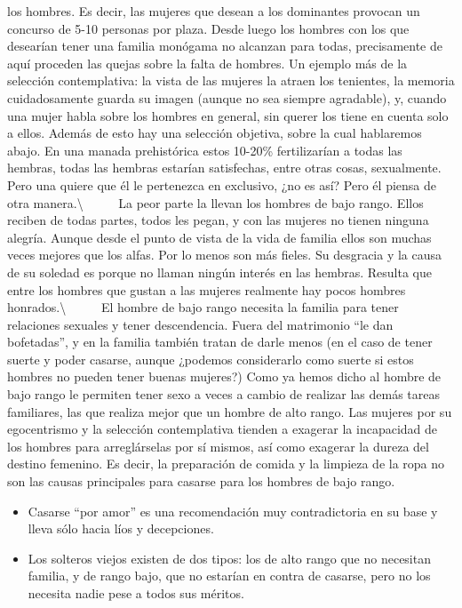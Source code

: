 los hombres. Es decir, las mujeres que desean a los dominantes provocan
un concurso de 5-10 personas por plaza. Desde luego los hombres con los
que desearían tener una familia monógama no alcanzan para todas,
precisamente de aquí proceden las quejas sobre la falta de hombres. Un
ejemplo más de la selección contemplativa: la vista de las mujeres la
atraen los tenientes, la memoria cuidadosamente guarda su imagen (aunque
no sea siempre agradable), y, cuando una mujer habla sobre los hombres
en general, sin querer los tiene en cuenta solo a ellos. Además de esto
hay una selección objetiva, sobre la cual hablaremos abajo. En una
manada prehistórica estos 10-20\% fertilizarían a todas las hembras,
todas las hembras estarían satisfechas, entre otras cosas, sexualmente.
Pero una quiere que él le pertenezca en exclusivo, ¿no es así? Pero él
piensa de otra manera.\textbackslash{} ~ ~ ~ La peor parte la llevan los
hombres de bajo rango. Ellos reciben de todas partes, todos les pegan, y
con las mujeres no tienen ninguna alegría. Aunque desde el punto de
vista de la vida de familia ellos son muchas veces mejores que los
alfas. Por lo menos son más fieles. Su desgracia y la causa de su
soledad es porque no llaman ningún interés en las hembras. Resulta que
entre los hombres que gustan a las mujeres realmente hay pocos hombres
honrados.\textbackslash{} ~ ~ ~ El hombre de bajo rango necesita la
familia para tener relaciones sexuales y tener descendencia. Fuera del
matrimonio ``le dan bofetadas'', y en la familia también tratan de darle
menos (en el caso de tener suerte y poder casarse, aunque ¿podemos
considerarlo como suerte si estos hombres no pueden tener buenas
mujeres?) Como ya hemos dicho al hombre de bajo rango le permiten tener
sexo a veces a cambio de realizar las demás tareas familiares, las que
realiza mejor que un hombre de alto rango. Las mujeres por su
egocentrismo y la selección contemplativa tienden a exagerar la
incapacidad de los hombres para arreglárselas por sí mismos, así como
exagerar la dureza del destino femenino. Es decir, la preparación de
comida y la limpieza de la ropa no son las causas principales para
casarse para los hombres de bajo rango.

\begin{itemize}
\tightlist
\item
  Casarse ``por amor'' es una recomendación muy contradictoria en su
  base y lleva sólo hacia líos y decepciones.
\item
  Los solteros viejos existen de dos tipos: los de alto rango que no
  necesitan familia, y de rango bajo, que no estarían en contra de
  casarse, pero no los necesita nadie pese a todos sus méritos.
\end{itemize}

